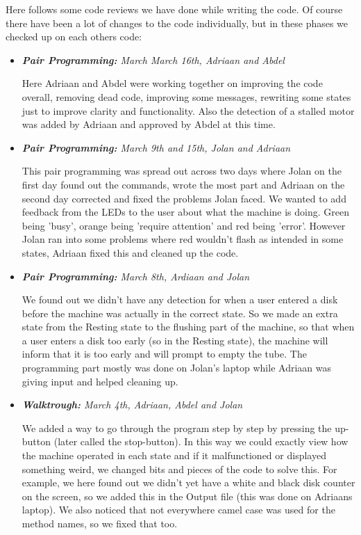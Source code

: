 \begin{comment}
\end{itemize}

 To my knowledge this can be removed
\end{comment}
Here follows some code reviews we have done while writing the code. Of course there have been a lot of changes to the code individually, but in these phases we checked up on each others code:

\begin{itemize}
\item\textit{\textbf{Pair Programming:} March March 16th, Adriaan and Abdel}

Here Adriaan and Abdel were working together on improving the code overall, removing dead code, improving some messages, rewriting some states just to improve clarity and functionality. Also the detection of a stalled motor was added by Adriaan and approved by Abdel at this time.
\newpage
\item\textit{\textbf{Pair Programming:} March 9th and 15th, Jolan and Adriaan}

This pair programming was spread out across two days where Jolan on the first day found out the commands, wrote the most part and Adriaan on the second day corrected and fixed the problems Jolan faced. We wanted to add feedback from the LEDs to the user about what the machine is doing. Green being 'busy', orange being 'require attention' and red being 'error'. However Jolan ran into some problems where red wouldn't flash as intended in some states, Adriaan fixed this and cleaned up the code.

\item \textit{\textbf{Pair Programming:} March 8th, Ardiaan and Jolan}

We found out we didn't have any detection for when a user entered a disk before the machine was actually in the correct state. So we made an extra state from the Resting state to the flushing part of the machine, so that when a user enters a disk too early (so in the Resting state), the machine will inform that it is too early and will prompt to empty the tube. The programming part mostly was done on Jolan's laptop while Adriaan was giving input and helped cleaning up.

\item \textit{\textbf{Walktrough:} March 4th, Adriaan,  Abdel and Jolan}

We added a way to go through the program step by step by pressing the up-button (later called the stop-button). In this way we could exactly view how the machine operated in each state and if it malfunctioned or displayed something weird, we changed bits and pieces of the code to solve this. For example, we here found out we didn't yet have a white and black disk counter on the screen, so we added this in the Output file (this was done on Adriaans laptop). We also noticed that not everywhere camel case was used for the method names, so we fixed that too.


\end{itemize}

